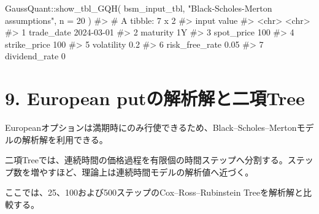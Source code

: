 \documentclass[
  letterpaper,
  DIV=11,
  numbers=noendperiod]{scrreprt}
\newenvironment{Shaded}{\begin{snugshade}}{\end{snugshade}}
\newcommand{\AttributeTok}[1]{\textcolor[rgb]{0.40,0.45,0.13}{#1}}
\newcommand{\CommentTok}[1]{\textcolor[rgb]{0.37,0.37,0.37}{#1}}
\newcommand{\DecValTok}[1]{\textcolor[rgb]{0.68,0.00,0.00}{#1}}
\newcommand{\FunctionTok}[1]{\textcolor[rgb]{0.28,0.35,0.67}{#1}}
\newcommand{\NormalTok}[1]{\textcolor[rgb]{0.00,0.23,0.31}{#1}}
\newcommand{\SpecialCharTok}[1]{\textcolor[rgb]{0.37,0.37,0.37}{#1}}
\newcommand{\StringTok}[1]{\textcolor[rgb]{0.13,0.47,0.30}{#1}}
\begin{document}
\begin{Shaded}
\begin{Highlighting}[]
\NormalTok{GaussQuant}\SpecialCharTok{::}\FunctionTok{show\_tbl\_GQH}\NormalTok{(}
\NormalTok{  bsm\_input\_tbl,}
  \StringTok{"Black{-}Scholes{-}Merton assumptions"}\NormalTok{,}
  \AttributeTok{n =} \DecValTok{20}
\NormalTok{)}
\CommentTok{\#\textgreater{} \# A tibble: 7 x 2}
\CommentTok{\#\textgreater{}   input          value     }
\CommentTok{\#\textgreater{}   \textless{}chr\textgreater{}          \textless{}chr\textgreater{}     }
\CommentTok{\#\textgreater{} 1 trade\_date     2024{-}03{-}01}
\CommentTok{\#\textgreater{} 2 maturity       1Y        }
\CommentTok{\#\textgreater{} 3 spot\_price     100       }
\CommentTok{\#\textgreater{} 4 strike\_price   100       }
\CommentTok{\#\textgreater{} 5 volatility     0.2       }
\CommentTok{\#\textgreater{} 6 risk\_free\_rate 0.05      }
\CommentTok{\#\textgreater{} 7 dividend\_rate  0}
\end{Highlighting}
\end{Shaded}

\section{9. European
putの解析解と二項Tree}\label{european-putux306eux89e3ux6790ux89e3ux3068ux4e8cux9805tree}

Europeanオプションは満期時にのみ行使できるため、Black--Scholes--Mertonモデルの解析解を利用できる。

二項Treeでは、連続時間の価格過程を有限個の時間ステップへ分割する。ステップ数を増やすほど、理論上は連続時間モデルの解析値へ近づく。

ここでは、25、100および500ステップのCox--Ross--Rubinstein
Treeを解析解と比較する。
\end{document}
